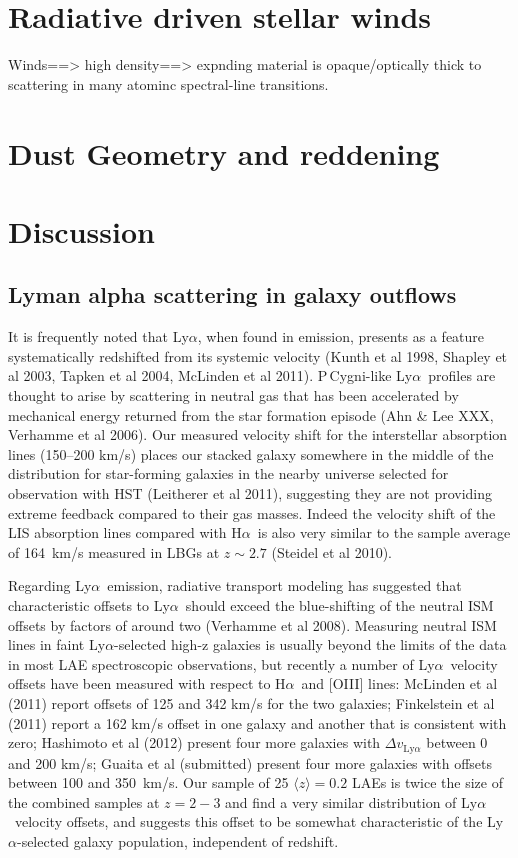 \documentclass[manuscript]{emulateapj}
\newcommand{\lya}{Ly$\alpha$}
\newcommand{\ha}{H$\alpha$}
\begin{document}
\section{Radiative driven stellar winds}
Winds==> high density==> expnding material is opaque/optically thick
to scattering in many atominc spectral-line transitions.

\section{Dust Geometry and reddening}


\section{Discussion} 

\subsection{Lyman alpha scattering in galaxy outflows} 

It is frequently noted that \lya, when found in emission, presents as 
a feature systematically redshifted from its systemic velocity 
(Kunth et al 1998, Shapley et al 2003, Tapken et al 2004, McLinden et al 2011). 
P\,Cygni-like \lya\ profiles are thought to arise by scattering in neutral
gas that has been accelerated by mechanical energy returned from the star
formation episode (Ahn \& Lee XXX, Verhamme et al 2006). Our measured velocity
shift for the interstellar absorption lines (150--200 km/s) places our stacked
galaxy somewhere in the middle of the distribution for star-forming galaxies
in the nearby universe selected for observation with HST (Leitherer et al 2011),
suggesting they are not providing extreme feedback compared to their gas 
masses.  Indeed the velocity shift of the LIS absorption lines compared with 
\ha\ is also very similar to the sample average of 164~km/s measured in LBGs 
at $z\sim 2.7$ (Steidel et al 2010). 

Regarding \lya\ emission, radiative transport modeling has suggested that 
characteristic offsets to 
\lya\ should exceed the blue-shifting of the neutral ISM offsets by factors 
of around
two (Verhamme et al 2008). Measuring neutral ISM lines in faint \lya-selected
high-z galaxies is usually beyond the limits of the data in most LAE 
spectroscopic observations, but recently a number of \lya\ velocity offsets
have been measured with respect to \ha\ and [OIII] lines: McLinden et al
(2011) report offsets of 125 and 342 km/s for the two galaxies; Finkelstein
et al (2011) report a 162 km/s offset in one galaxy and another that is 
consistent with zero; Hashimoto et al (2012) present four more galaxies with
$\Delta v_{\mathrm{Ly}\alpha}$ between 0 and 200 km/s; Guaita et al (submitted)
present four more galaxies with offsets between 100 and 350~km/s. Our sample
of 25 $\langle z\rangle=0.2$ LAEs is twice the size of the combined samples
at $z=2-3$ and find a very similar distribution of \lya\ velocity offsets, 
and suggests this offset to be somewhat characteristic of the \lya-selected
galaxy population, independent of redshift.
\end{document}
